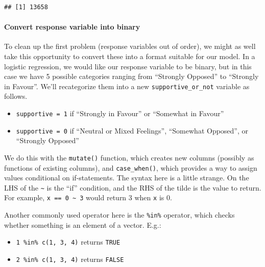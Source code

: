 \documentclass[
]{book}
\providecommand{\tightlist}{%
  \setlength{\itemsep}{0pt}\setlength{\parskip}{0pt}}
\begin{document}
\begin{verbatim}
## [1] 13658
\end{verbatim}

\hypertarget{convert-response-variable-into-binary}{%
\paragraph{Convert response variable into binary}\label{convert-response-variable-into-binary}}

To clean up the first problem (response variables out of order), we might as well take this opportunity to convert these into a format suitable for our model. In a logistic regression, we would like our response variable to be binary, but in this case we have 5 possible categories ranging from ``Strongly Opposed'' to ``Strongly in Favour''. We'll recategorize them into a new \texttt{supportive\_or\_not} variable as follows.

\begin{itemize}
\tightlist
\item
  \texttt{supportive\ =\ 1} if ``Strongly in Favour'' or ``Somewhat in Favour''
\item
  \texttt{supportive\ =\ 0} if ``Neutral or Mixed Feelings'', ``Somewhat Opposed'', or ``Strongly Opposed''
\end{itemize}

We do this with the \texttt{mutate()} function, which creates new columns (possibly as functions of existing columns), and \texttt{case\_when()}, which provides a way to assign values conditional on if-statements. The syntax here is a little strange. On the LHS of the \texttt{\textasciitilde{}} is the ``if'' condition, and the RHS of the tilde is the value to return. For example, \texttt{x\ ==\ 0\ \textasciitilde{}\ 3} would return 3 when \texttt{x} is 0.

Another commonly used operator here is the \texttt{\%in\%} operator, which checks whether something is an element of a vector. E.g.:

\begin{itemize}
\tightlist
\item
  \texttt{1\ \%in\%\ c(1,\ 3,\ 4)} returns \texttt{TRUE}
\item
  \texttt{2\ \%in\%\ c(1,\ 3,\ 4)} returns \texttt{FALSE}
\end{itemize}
\end{document}
